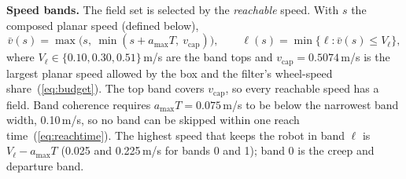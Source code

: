 \documentclass[sensors,article,submit,moreauthors]{Definitions/mdpi}
\begin{document}
\textbf{Speed bands.} The field set is selected by the \emph{reachable} speed. With $s$ the composed planar speed (defined below),
\begin{equation}
\bar{v}(s) = \max\!\big(s,\ \min(s + a_{\max}T,\ v_{\text{cap}})\big),
\qquad
\ell(s) = \min\{\ell : \bar{v}(s) \le V_\ell\},
\label{eq:band}
\end{equation}
where $V_\ell \in \{0.10, 0.30, 0.51\}$\,m/s are the band tops and $v_{\text{cap}} = 0.5074$\,m/s is the largest planar speed allowed by the box and the filter's wheel-speed share~(\ref{eq:budget}). The top band covers $v_{\text{cap}}$, so every reachable speed has a field. Band coherence requires $a_{\max}T = 0.075$\,m/s to be below the narrowest band width, 0.10\,m/s, so no band can be skipped within one reach time~(\ref{eq:reachtime}). The highest speed that keeps the robot in band $\ell$ is $V_\ell - a_{\max}T$ (0.025 and 0.225\,m/s for bands 0 and 1); band 0 is the creep and departure band.
\end{document}
